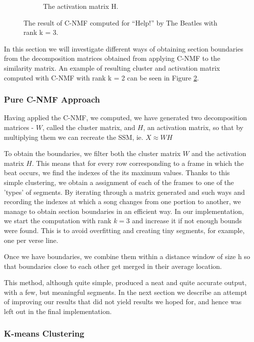 \begin{figure}
\begin{subfigure}[b]{0.47\textwidth}
                \caption{The activation matrix H.}
                \label{fig:Hmatrix}
        \end{subfigure}
          \caption{The result of C-NMF computed for ``Help!'' by The Beatles with rank k = 3.}
        \label{fig:CNMFbeatles}
\end{figure}
 
In this section we will investigate different ways of obtaining section boundaries from the decomposition matrices obtained from applying C-NMF to the similarity matrix. An example of resulting cluster and activation matrix computed with C-NMF with rank k = 2 can be seen in Figure \ref{fig:CNMFbeatles}.

\subsubsection*{Pure C-NMF Approach}
\label{sec:finalBounds}
Having applied the C-NMF, we computed, we have generated two decomposition matrices - $W$, called the cluster matrix, and $H$, an activation matrix, so that by multiplying them we can recreate the SSM, ie. $X \approx  WH$       
        
To obtain the boundaries, we filter both the cluster matrix $W$ and the activation matrix $H$. This means that for every row corresponding to a frame in which the beat occurs, we find the indexes of the its maximum values. Thanks to this simple clustering, we obtain a assignment of each of the frames to one of the 'types' of segments. By iterating through a matrix generated and such ways and recording the indexes at which a song changes from one portion to another, we manage to obtain section boundaries in an efficient way. In our implementation, we start the computation with rank $k = 3$ and increase it if not enough bounds were found. This is to avoid overfitting and creating tiny segments, for example, one per verse line.

Once we have boundaries, we combine them within a distance window of size h so that boundaries close to each other get merged in their average location.

This method, although quite simple, produced a neat and quite accurate output, with a few, but meaningful segments. In the next section we describe an attempt of improving our results that did not yield results we hoped for, and hence was left out in the final implementation.

\subsubsection*{K-means Clustering}
\label{sec:kmeans}

